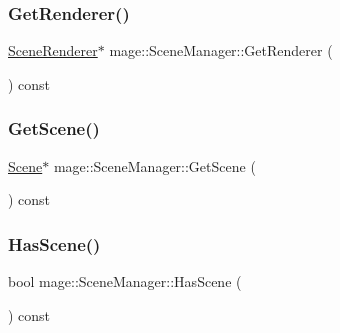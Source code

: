 \subsubsection{\texorpdfstring{Get\+Renderer()}{GetRenderer()}}
{\footnotesize\ttfamily \hyperlink{classmage_1_1_scene_renderer}{Scene\+Renderer}$\ast$ mage\+::\+Scene\+Manager\+::\+Get\+Renderer (\begin{DoxyParamCaption}{ }\end{DoxyParamCaption}) const}

\hypertarget{classmage_1_1_scene_manager_a55d720c9f90cfc46dbf07d46537072c1}{}\label{classmage_1_1_scene_manager_a55d720c9f90cfc46dbf07d46537072c1} 
\subsubsection{\texorpdfstring{Get\+Scene()}{GetScene()}}
{\footnotesize\ttfamily \hyperlink{classmage_1_1_scene}{Scene}$\ast$ mage\+::\+Scene\+Manager\+::\+Get\+Scene (\begin{DoxyParamCaption}{ }\end{DoxyParamCaption}) const\hspace{0.3cm}{\ttfamily [noexcept]}}

\hypertarget{classmage_1_1_scene_manager_ac767593112ea1d8b47cc79283cf7c47e}{}\label{classmage_1_1_scene_manager_ac767593112ea1d8b47cc79283cf7c47e} 
\subsubsection{\texorpdfstring{Has\+Scene()}{HasScene()}}
{\footnotesize\ttfamily bool mage\+::\+Scene\+Manager\+::\+Has\+Scene (\begin{DoxyParamCaption}{ }\end{DoxyParamCaption}) const\hspace{0.3cm}{\ttfamily [noexcept]}}

\hypertarget{classmage_1_1_scene_manager_adeb1fd1d9f40229ccb0ef8adfb55f4cc}{}\label{classmage_1_1_scene_manager_adeb1fd1d9f40229ccb0ef8adfb55f4cc} 
